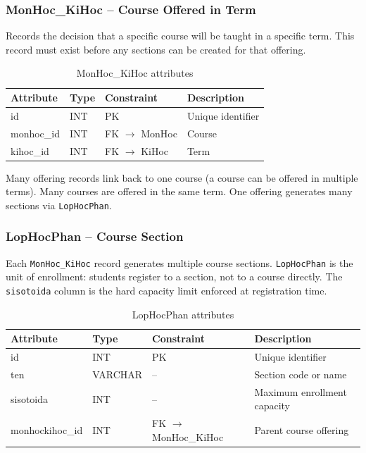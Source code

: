 \documentclass[12pt,a4paper]{report}
\begin{document}
\subsubsection{MonHoc\_KiHoc -- Course Offered in Term}

Records the decision that a specific course will be taught in a specific term. This record must exist before any sections can be created for that offering.

\begin{table}[H]
\renewcommand{\arraystretch}{1.35}
\caption{MonHoc\_KiHoc attributes}
\label{tab:monhoc_kihoc}
\begin{tabular}{|p{3cm}|p{2.5cm}|p{2.5cm}|p{5.5cm}|}
  \hline
  \textbf{Attribute} & \textbf{Type} & \textbf{Constraint} & \textbf{Description} \\
  \hline
  id & INT & PK & Unique identifier \\
  \hline
  monhoc\_id & INT & FK $\to$ MonHoc & Course \\
  \hline
  kihoc\_id & INT & FK $\to$ KiHoc & Term \\
  \hline
\end{tabular}
\end{table}

Many offering records link back to one course (a course can be offered in multiple terms). Many courses are offered in the same term. One offering generates many sections via \texttt{LopHocPhan}.

\subsubsection{LopHocPhan -- Course Section}

Each \texttt{MonHoc\_KiHoc} record generates multiple course sections. \texttt{LopHocPhan} is the unit of enrollment: students register to a section, not to a course directly. The \texttt{sisotoida} column is the hard capacity limit enforced at registration time.

\begin{table}[H]
\renewcommand{\arraystretch}{1.35}
\caption{LopHocPhan attributes}
\label{tab:lophocphan}
\begin{tabular}{|p{3.5cm}|p{2.5cm}|p{2.5cm}|p{5cm}|}
  \hline
  \textbf{Attribute} & \textbf{Type} & \textbf{Constraint} & \textbf{Description} \\
  \hline
  id & INT & PK & Unique identifier \\
  \hline
  ten & VARCHAR & -- & Section code or name \\
  \hline
  sisotoida & INT & -- & Maximum enrollment capacity \\
  \hline
  monhockihoc\_id & INT & FK $\to$ MonHoc\_KiHoc & Parent course offering \\
  \hline
\end{tabular}
\end{table}
\end{document}
